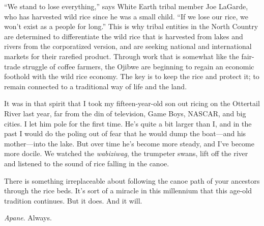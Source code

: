 ``We stand to lose everything,'' says White Earth tribal member Joe
LaGarde, who has harvested wild rice since he was a small child. ``If we
lose our rice, we won't exist as a people for long.'' This is why tribal
entities in the North Country are determined to differentiate the wild
rice that is harvested from lakes and rivers from the corporatized
version, and are seeking national and international markets for their
rarefied product. Through work that is somewhat like the fair-trade
struggle of coffee farmers, the Ojibwe are beginning to regain an
economic foothold with the wild rice economy. The key is to keep the
rice and protect it; to remain connected to a traditional way of life
and the land.

It was in that spirit that I took my fifteen-year-old son out ricing on
the Ottertail River last year, far from the din of television, Game
Boys, NASCAR, and big cities. I let him pole for the first time. He's
quite a bit larger than I, and in the past I would do the poling out of
fear that he would dump the boat---and his mother---into the lake.
But over time he's become more steady, and I've become more docile. We
watched the \emph{wabiziwag}, the trumpeter swans, lift off the river
and listened to the sound of rice falling in the canoe.

There is something irreplaceable about following the canoe path of your
ancestors through the rice beds. It's sort of a miracle in this
millennium that this age-old tradition continues. But it does. And it
will.

\emph{Apane}. Always.

